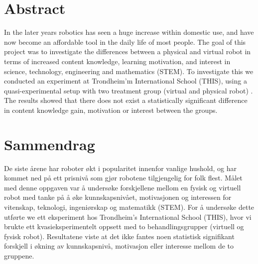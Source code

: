 \section*{Abstract}
In the later years robotics has seen a huge increase within domestic use, and have now become an affordable tool in the daily life of most people.
The goal of this project was to investigate the differences between a physical and virtual robot in terms of increased content knowledge, learning motivation, and interest in science, technology, engineering and mathematics (STEM).
To investigate this we conducted an experiment at Trondheim'm International School (THIS), using a quasi-experimental setup with two treatment group (virtual and physical robot) .
The results showed that there does not exist a statistically significant difference in content knowledge gain, motivation or interest between the groups. 

\newpage
\section*{Sammendrag}
 De siste årene har roboter økt i popularitet innenfor vanlige hushold, og har kommet ned på ett prisnivå som gjør robotene tilgjengelig for folk flest.
Målet med denne oppgaven var å undersøke forskjellene mellom en fysisk og virtuell robot med tanke på å øke kunnskapsnivået, motivasjonen og interessen for vitenskap, teknologi, ingeniørskap og matematikk (STEM).
For å undersøke dette utførte we ett eksperiment hos Trondheim's International School (THIS), hvor vi brukte ett kvasieksperimentelt oppsett med to behandlingsgrupper (virtuell og fysisk robot).
Resultatene viste at det ikke fantes noen statistisk signifikant forskjell i økning av kunnskapsnivå, motivasjon eller interesse mellom de to gruppene.